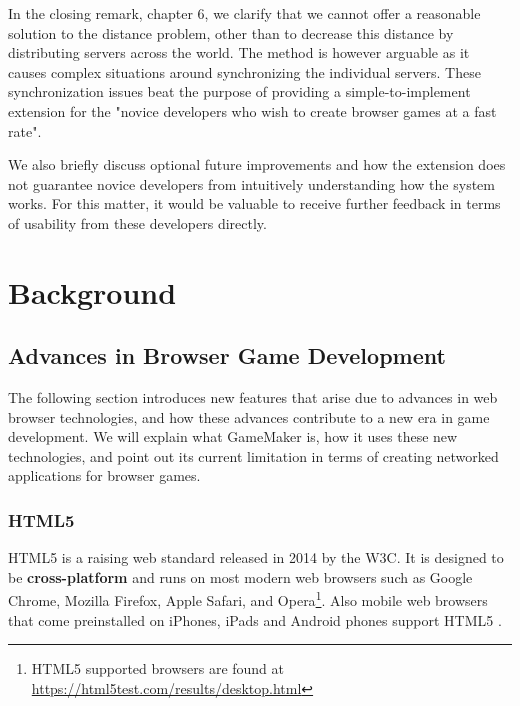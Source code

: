 \documentclass[bsc, 12pt, twoside, singlespacing, parskip, abbrevs, notimes, normalheadings, logo, deptreport]{styles/infthesis}
\begin{document}
\vspace{1em}
In the closing remark, chapter 6, we clarify that we cannot offer a reasonable solution to the distance problem, other than to decrease this distance by distributing servers across the world. The method is however arguable as it causes complex situations around synchronizing the individual servers. These synchronization issues beat the purpose of providing a simple-to-implement extension for the "novice developers who wish to create browser games at a fast rate".

\vspace{1em}
We also briefly discuss optional future improvements and how the extension does not guarantee novice developers from intuitively understanding how the system works. For this matter, it would be valuable to receive further feedback in terms of usability from these developers directly.



\chapter{Background}

\section{Advances in Browser Game Development}
The following section introduces new features that arise due to advances in web browser technologies, and how these advances contribute to a new era in game development. We will explain what GameMaker is, how it uses these new technologies, and point out its current limitation in terms of creating networked applications for browser games.

\subsection{HTML5}
HTML5 is a raising web standard released in 2014 by the W3C. It is designed to be \textbf{cross-platform} and runs on most modern web browsers such as Google Chrome, Mozilla Firefox, Apple Safari, and Opera\footnote{HTML5 supported browsers are found at \url{https://html5test.com/results/desktop.html}}. Also mobile web browsers that come preinstalled on iPhones, iPads and Android phones support HTML5 \cite{Pro_HTML5_Programming}.
\end{document}
